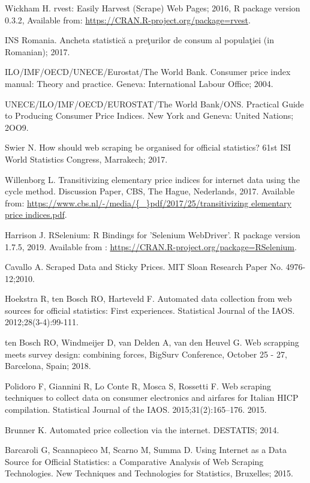 \documentclass[]{article}
\begin{document}
\begin{thebibliography}{99}
Wickham H. rvest: Easily Harvest (Scrape) Web Pages; 2016, {R package version 0.3.2}, Available from:
\url{https://CRAN.R-project.org/package=rvest}.

INS Romania. Ancheta statistică a preţurilor de consum al populaţiei (in Romanian); 2017.

ILO/IMF/OECD/UNECE/Eurostat/The World Bank. Consumer price index manual: Theory and practice. Geneva: International Labour Office; 2004.

UNECE/ILO/IMF/OECD/EUROSTAT/The World Bank/ONS. Practical Guide to Producing Consumer Price Indices. New York and Geneva: United Nations; 2OO9.


Swier N. How should web scraping be organised for official statistics? 61st ISI World Statistics Congress, Marrakech; 2017.


Willenborg L. Transitivizing elementary price indices for internet data using the cycle method. Discussion Paper, CBS, The Hague, Nederlands, 2017. Available from: \url{https://www.cbs.nl/-/media/{\_}pdf/2017/25/transitivizing elementary price indices.pdf}.


Harrison J. RSelenium: R Bindings for 'Selenium WebDriver'. R package version 1.7.5, 2019. Available from :
\url{https://CRAN.R-project.org/package=RSelenium}.


Cavallo A. Scraped Data and Sticky Prices. MIT Sloan Research Paper No. 4976-12;2010.


Hoekstra R, ten Bosch RO, Harteveld F. Automated data collection from web sources for official statistics: First experiences. 
Statistical Journal of the IAOS. 2012;28(3-4):99-111.

ten Bosch RO, Windmeijer D, van Delden A, van den Heuvel G. Web scrapping meets survey design: combining forces,
BigSurv Conference, October 25 - 27, Barcelona, Spain; 2018.


Polidoro F, Giannini R, Lo Conte R, Mosca S, Rossetti F. Web scraping techniques to collect data on consumer electronics and airfares for Italian HICP compilation. Statistical Journal of the IAOS. 2015;31(2):165–176.
2015.

Brunner K. Automated price collection via the internet. DESTATIS; 2014.

Barcaroli G, Scannapieco M, Scarno M, Summa D. Using Internet as a Data Source for Official Statistics: a Comparative Analysis of Web Scraping Technologies.
New Techniques and Technologies for Statistics, Bruxelles; 2015.



\end{thebibliography}
\end{document}
